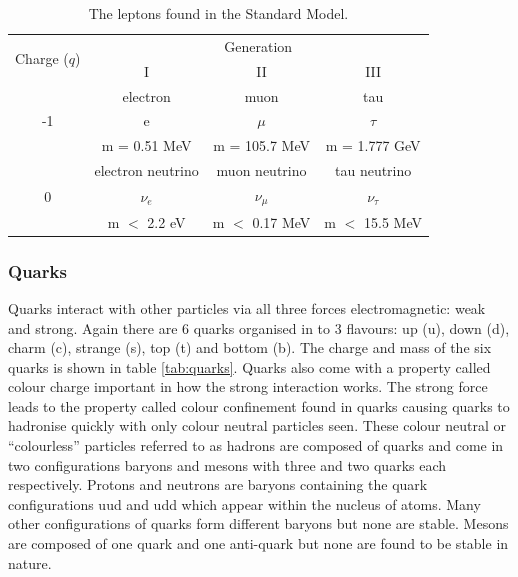     \begin {table}[h]
        \begin{center}
        \begin{tabular}{|c|c|c|c|}
            \hline
            \multirow{2}{*}{Charge ($q$)}      & \multicolumn{3}{c|}{Generation} \\
            \cline{2-4}
                                & I     & II    & III   \\
            \hline
            \multirow{3}{*}{\Large -1} & electron & muon & tau \\
                                & {\Huge e}     & {\Huge $\mu$} & {\Huge $\tau$} \\
                                & m = 0.51 MeV  & m = 105.7 MeV & m = 1.777 GeV \\
            \hline
            \multirow{3}{*}{\Large 0} & electron neutrino & muon neutrino & tau neutrino \\
                                & {\Huge $\nu_{e}$} & {\Huge $\nu_{\mu}$} & {\Huge $\nu_{\tau}$}     \\
                                & m $<$ 2.2 eV      & m $<$ 0.17 MeV      & m $<$ 15.5 MeV \\
            \hline
        \end{tabular}
        \caption{The leptons found in the Standard Model.}
        \label{tab:leptons}
        \end{center}
    \end {table}
 
    \subsubsection*{Quarks}
    Quarks interact with other particles via all three forces electromagnetic: weak and strong. Again there are 6 quarks organised in to 3 flavours: up (u), down (d), charm (c), strange (s), top (t) and bottom (b). The charge and mass of the six quarks is shown in table \ref{tab:quarks}. Quarks also come with a property called colour charge important in how the strong interaction works. The strong force leads to the property called colour confinement found in quarks causing quarks to hadronise quickly with only colour neutral particles seen. These colour neutral or ``colourless'' particles referred to as hadrons are composed of quarks and come in two configurations baryons and mesons with three and two quarks each respectively. Protons and neutrons are baryons containing the quark configurations uud and udd which appear within the nucleus of atoms. Many other configurations of quarks form different baryons but none are stable. Mesons are composed of one quark and one anti-quark but none are found to be stable in nature. 

